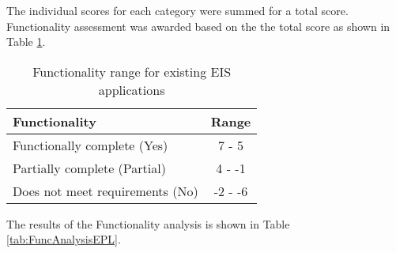 The individual scores for each category were summed for a total score. Functionality assessment was awarded based on the the total score as shown in Table \ref{tab:funcrange}.

\begin{table}[H]
\centering
\caption{Functionality range for existing EIS applications}
\label{tab:funcrange}
\begin{tabular}{@{}lc@{}}
\toprule
\textbf{Functionality} & \textbf{Range} \\ \midrule
Functionally complete (Yes) & 7 - 5 \\
Partially complete (Partial) & 4 - -1 \\
Does not meet requirements (No) & -2 - -6 \\ \bottomrule
\end{tabular}
\end{table}

The results of the Functionality analysis is shown in Table \ref{tab:FuncAnalysisEPL}. 



